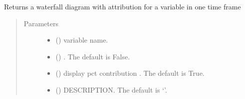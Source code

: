 \documentclass[letterpaper,10pt,english]{sphinxmanual}
\begin{document}
\begin{fulllineitems}

\begin{fulllineitems}
\label{\detokenize{core/modelclass:modelclass.Dekomp_Mixin.dekomp_plot_per}}
\pysigstartsignatures
{}
\pysigstopsignatures
\sphinxAtStartPar
Returns  a waterfall diagram with attribution for a variable in one time frame
\begin{quote}\begin{description}
\item[{Parameters}] \leavevmode\begin{itemize}
\item {} 
\sphinxAtStartPar
{} () \textendash{} variable name.

\item {} 
\sphinxAtStartPar
{} (\sphinxstyleliteralemphasis{\sphinxupquote{, }}) \textendash{} . The default is False.

\item {} 
\sphinxAtStartPar
{} (\sphinxstyleliteralemphasis{\sphinxupquote{, }}) \textendash{} display pct contribution . The default is True.

\item {} 
\sphinxAtStartPar
{} (\sphinxstyleliteralemphasis{\sphinxupquote{, }}) \textendash{} DESCRIPTION. The default is ‘’.


\end{itemize}
\end{description}
\end{quote}
\end{fulllineitems}
\end{fulllineitems}
\end{document}
